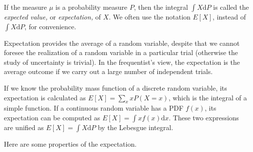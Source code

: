 \documentclass[11pt]{article}
\begin{document}
If the measure \(\mu\) is a probability measure \(P\), then the integral
\(\int X\mathrm{d}P\) is called the \emph{expected value,} or
\emph{expectation,} of \(X\). We often use the notation
\(E\left[X\right]\), instead of \(\int X\mathrm{d}P\), for convenience.

Expectation provides the average of a random variable, despite that we
cannot foresee the realization of a random variable in a particular
trial (otherwise the study of uncertainty is trivial). In the
frequentist's view, the expectation is the average outcome if we carry
out a large number of independent trials.

If we know the probability mass function of a discrete random variable,
its expectation is calculated as
\(E\left[X\right]=\sum_{x}xP\left(X=x\right)\), which is the integral of
a simple function. If a continuous random variable has a PDF \(f(x)\),
its expectation can be computed as
\(E\left[X\right]=\int xf\left(x\right)\mathrm{d}x\). These two
expressions are unified as \(E[X] = \int X \mathrm{d} P\) by the
Lebesgue integral.

    Here are some properties of the expectation.
\end{document}
